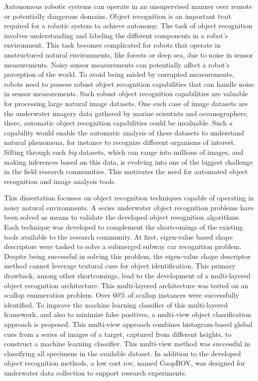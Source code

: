 Autonomous robotic systems can operate in an unsupervised manner over remote or potentially dangerous domains.
Object recognition is an important trait required for a robotic system to achieve autonomy.
The task of object recognition involves understanding and labeling the different components in a robot's environment. This task becomes complicated for robots that operate in unstructured natural environments, like forests or deep sea, due to noise in sensor measurements. Noisy sensor measurements can potentially affect a robot's perception of the world. To avoid being misled by corrupted measurements, robots need to possess robust object recognition capabilities that can handle noise in sensor measurements. Such robust object recognition capabilities are valuable for processing large natural image datasets. One such case of image datasets are the underwater imagery data gathered by marine scientists and oceanographers; there, automatic object recognition capabilities could be invaluable. Such a capability would enable the automatic analysis of these datasets to understand natural phenomena, for instance to recognize different organisms of interest. Sifting through such \emph{big} datasets, which can range into millions of images, and making inferences based on this data, is evolving into one of the biggest challenge in the field research communities. This motivates the need for automated object recognition and image analysis tools.

This dissertation focusses on object recognition techniques capable of operating in noisy natural environments.
A series underwater object recognition  problems have been solved as means to validate the developed object recognition algorithms. 
Each technique was developed to complement the shortcomings of the existing tools available to the research community. 
At first, eigen-value based shape descriptors were tasked to solve a submerged subway car recognition problem. Despite being successful in solving this problem, the eigen-value shape descriptor method cannot leverage textural cues for object identification. This primary drawback, among other shortcomings, lead to the development of a multi-layered object recognition architecture. This multi-layered architecture was tested on an scallop enumeration problem. Over 60\% of scallop instances were successfully identified. To improve the machine learning classifier of this multi-layered framework, and also to minimize false positives, a multi-view object classification approach is proposed. This multi-view approach combines histogram-based global cues from a series of images of a target, captured from different heights, to construct a machine learning classifier. This multi-view method was successful in classifying all specimens in the available dataset. In addition to the developed object recognition methods, a low cost \gls{rov}, 
named CoopROV, was designed for underwater data collection to support research experiments.
